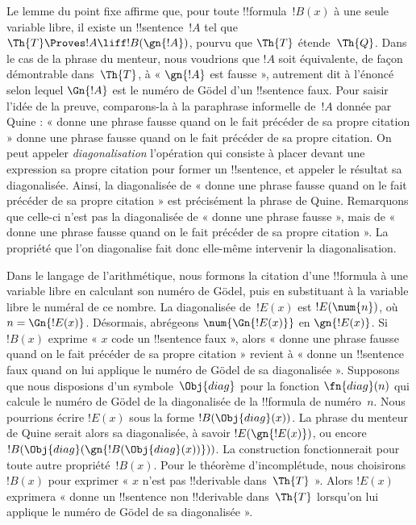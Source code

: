 \documentclass[../../../include/open-logic-section]{subfiles}
\begin{document}


\begin{explain}
Le lemme du point fixe affirme que, pour toute
!!{formula}~$!B(x)$ à une seule variable libre, il existe un !!{sentence}~$!A$
tel que $\Th{T}\Proves !A\liff !B(\gn{!A})$,
pourvu que $\Th{T}$ étende~$\Th{Q}$. Dans le cas de
la phrase du menteur, nous voudrions que $!A$ soit
équivalente, de façon démontrable dans~$\Th{T}$,
à « $\gn{!A}$ est fausse », autrement dit à l'énoncé
selon lequel $\Gn{!A}$ est le numéro de Gödel d'un
!!{sentence} faux. Pour saisir l'idée de la preuve,
comparons-la à la paraphrase informelle de~$!A$
donnée par Quine : « donne une phrase fausse quand on
le fait précéder de sa propre citation » donne une
phrase fausse quand on le fait précéder de sa propre
citation. On peut appeler \emph{diagonalisation}
l'opération qui consiste à placer devant une
expression sa propre citation pour former un
!!{sentence}, et appeler le résultat sa diagonalisée.
Ainsi, la diagonalisée de « donne une phrase fausse
quand on le fait précéder de sa propre citation »
est précisément la phrase de Quine. Remarquons que
celle-ci n'est pas la diagonalisée de « donne une
phrase fausse », mais de « donne une phrase fausse
quand on le fait précéder de sa propre citation ».
La propriété que l'on diagonalise fait donc
elle-même intervenir la diagonalisation.

Dans le langage de l'arithmétique, nous formons
la citation d'une !!{formula} à une variable libre
en calculant son numéro de Gödel, puis en substituant
à la variable libre le numéral de ce nombre. La
diagonalisée de~$!E(x)$ est $!E(\num{n})$, où
$n=\Gn{!E(x)}$. Désormais, abrégeons
$\num{\Gn{!E(x)}}$ en $\gn{!E(x)}$. Si $!B(x)$
exprime « $x$ code un !!{sentence} faux », alors
« donne une phrase fausse quand on le fait précéder
de sa propre citation » revient à « donne un
!!{sentence} faux quand on lui applique le numéro
de Gödel de sa diagonalisée ». Supposons que nous
disposions d'un symbole~$\Obj{diag}$ pour la fonction
$\fn{diag}(n)$ qui calcule le numéro de Gödel de la
diagonalisée de la !!{formula} de numéro~$n$.
Nous pourrions écrire $!E(x)$ sous la forme
$!B(\Obj{diag}(x))$. La phrase du menteur de Quine
serait alors sa diagonalisée, à savoir
$!E(\gn{!E(x)})$, ou encore
$!B(\Obj{diag}(\gn{!B(\Obj{diag}(x))}))$.
La construction fonctionnerait pour toute autre
propriété~$!B(x)$. Pour le théorème d'incomplétude,
nous choisirons $!B(x)$ pour exprimer « $x$ n'est
pas !!{derivable} dans~$\Th{T}$ ». Alors $!E(x)$
exprimera « donne un !!{sentence} non
!!{derivable} dans~$\Th{T}$ lorsqu'on lui applique
le numéro de Gödel de sa diagonalisée ».


\end{explain}
\end{document}
